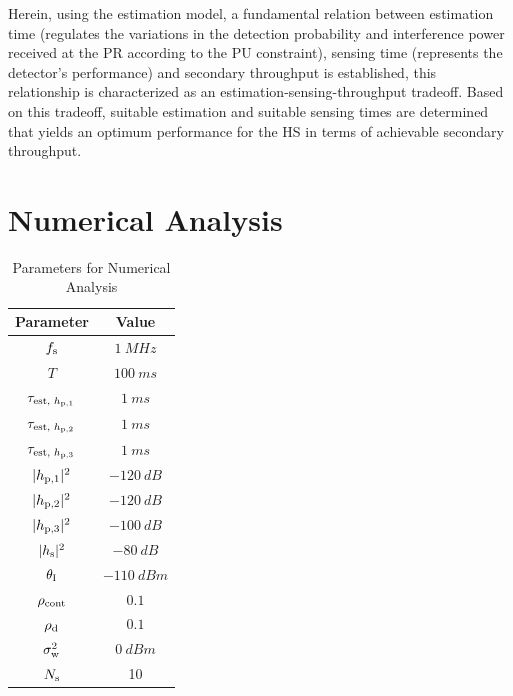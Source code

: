 \begin{remark} \label{co:coro1} 
\normalfont
Herein, using the estimation model, a fundamental relation between estimation time (regulates the variations in the detection probability and interference power received at the PR according to the PU constraint), sensing time (represents the detector's performance) and secondary throughput is established, this relationship is characterized as an estimation-sensing-throughput tradeoff. Based on this tradeoff, suitable estimation and suitable sensing times are determined that yields an optimum performance for the HS in terms of achievable secondary throughput. 
\end{remark} 
\section{Numerical Analysis} \label{sec:num_ana}

\begin{table}
\renewcommand{\arraystretch}{1.4}
\caption{Parameters for Numerical Analysis}
\label{tb:tb2}
\centering
\begin{tabular}{c||c}
\hline
\bfseries Parameter & \bfseries Value \\
\hline\hline
$f_{\text{s}}$ & $\SI{1}{MHz}$ \\ 
$T$ & $\SI{100}{ms}$ \\ 
$\tau_{\text{est, $h_{\text{p,1}}$}}$ & $\SI{1}{ms}$ \\
$\tau_{\text{est, $h_{\text{p,2}}$}}$ & $\SI{1}{ms}$ \\
$\tau_{\text{est, $h_{\text{p,3}}$}}$ & $\SI{1}{ms}$ \\
$|h_{\text{p,1}}|^2$ & $\SI{-120}{dB}$ \\ 
$|h_{\text{p,2}}|^2$ & $\SI{-120}{dB}$ \\ 
$|h_{\text{p,3}}|^2$ & $\SI{-100}{dB}$ \\ 
$|h_{\text{s}}|^2$ & $\SI{-80}{dB}$ \\ 
$\theta_{\text{I}}$ & $\SI{-110}{dBm}$ \\ 
$\rho_{\text{cont}}$ & $0.1$ \\
$\rho_{\text{d}}$ & $0.1$ \\
$\sigma^2_{\text{w}}$ & $\SI{0}{dBm}$ \\
$N_{\text{s}}$ & 10 \\ \hline
\end{tabular}
\end{table}

